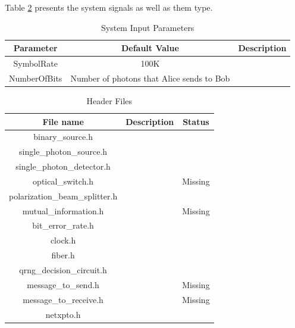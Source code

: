 Table \ref{tb:signals} presents the system signals as well as them type.

\begin{table}[hbt]
\centering
\caption{System Input Parameters}
\label{tb:inputparameters}
\begin{tabular}{|c|c|c|}
\hline
\textbf{Parameter}           & \textbf{Default Value}                           & \textbf{Description} \\ \hline
SymbolRate                   & 100K                                             &                 \\ \hline
NumberOfBits                 & Number of photons that Alice sends to Bob        &                 \\ \hline

\end{tabular}
\end{table}

\begin{table}[hbt]
\centering
\caption{Header Files}
\label{tb:signals}
\begin{tabular}{|c|c|c|}
\hline
\textbf{File name}              & \textbf{Description} & \textbf{Status} \\ \hline
binary\_source.h       &                      &                 \\ \hline
single\_photon\_source.h      &                      &                 \\ \hline
single\_photon\_detector.h       &                      &                 \\ \hline
optical\_switch.h                       &                      &       Missing          \\ \hline
polarization\_beam\_splitter.h                       &                      &                 \\ \hline
mutual\_information.h            &                      &            Missing     \\ \hline
bit\_error\_rate.h                       &                      &                 \\ \hline
clock.h                       &                      &                 \\ \hline
fiber.h                       &                      &                 \\ \hline
qrng\_decision\_circuit.h                       &                      &                 \\ \hline
message\_to\_send.h               &                      &      Missing           \\ \hline
message\_to\_receive.h            &                      &      Missing           \\ \hline
netxpto.h                       &                      &                 \\ \hline
\end{tabular}
\end{table}

